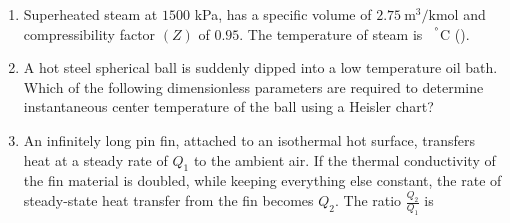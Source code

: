 \documentclass[journal]{IEEEtran}
\begin{document}
\begin{enumerate}
\hfill{}




\item Superheated steam at $1500$ kPa, has a specific volume of $2.75~\text{m}^3/\text{kmol}$ and compressibility factor $(Z)$ of $0.95$. The temperature of steam is \underline{\hspace{2cm}}~$^\degree$C ().

\begin{enumerate}
\end{enumerate}

\hfill{}

\item A hot steel spherical ball is suddenly dipped into a low temperature oil bath. Which of the following dimensionless parameters are required to determine instantaneous center temperature of the ball using a Heisler chart?

\begin{enumerate}
\end{enumerate}

\hfill{}

\item An infinitely long pin fin, attached to an isothermal hot surface, transfers heat at a steady rate of $Q_1$ to the ambient air. If the thermal conductivity of the fin material is doubled, while keeping everything else constant, the rate of steady-state heat transfer from the fin becomes $Q_2$. The ratio $\frac{Q_2}{Q_1}$ is

\begin{enumerate}
\end{enumerate}


\end{enumerate}
\end{document}
